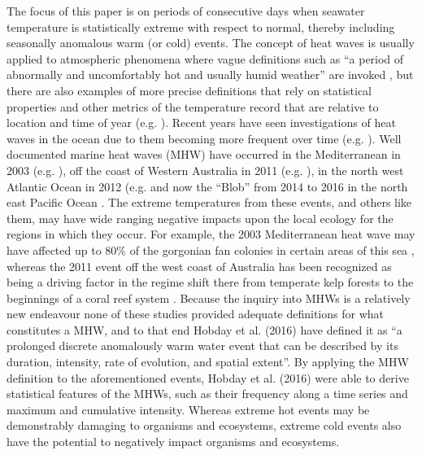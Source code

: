 \documentclass[a4paper,10pt,review]{elsarticle}
\begin{document}
The focus of this paper is on periods of consecutive days when seawater temperature is statistically extreme with respect to normal, thereby including seasonally anomalous warm (or cold) events. The concept of heat waves is usually applied to atmospheric phenomena where vague definitions such as ``a period of abnormally and uncomfortably hot and usually humid weather'' are invoked \cite{Glickman2000}, but there are also examples of more precise definitions that rely on statistical properties and other metrics of the temperature record that are relative to location and time of year (e.g. \cite{Meehl2004, Alexander2006, Fischer2010, Fischer2011}). Recent years have seen investigations of heat waves in the ocean due to them becoming more frequent over time (e.g. \cite{Mackenzie2007, Selig2010, Sura2011, Lima2012, DeCastro2014}). Well documented marine heat waves (MHW) have occurred in the Mediterranean in 2003 (e.g. \cite{Black2004, Olita2007, Garrabou2009}), off the coast of Western Australia in 2011 (e.g. \cite{Feng2013, Pearce2013, Wernberg2013}), in the north west Atlantic Ocean in 2012 (e.g. \cite{Mills2012, Chen2014, Chen2015} and now the ``Blob'' from 2014 to 2016 in the north east Pacific Ocean \cite{Bond2015}. The extreme temperatures from these events, and others like them, may have wide ranging negative impacts upon the local ecology for the regions in which they occur. For example, the 2003 Mediterranean heat wave may have affected up to 80\% of the gorgonian fan colonies in certain areas of this sea \cite{Garrabou2009}, whereas the 2011 event off the west coast of Australia has been recognized as being a driving factor in the regime shift there from temperate kelp forests to the beginnings of a coral reef system \cite{Wernberg2013}. Because the inquiry into MHWs is a relatively new endeavour none of these studies provided adequate definitions for what constitutes a MHW, and to that end Hobday et al. (2016) \cite{Hobday2016} have defined it as ``a prolonged discrete anomalously warm water event that can be described by its duration, intensity, rate of evolution, and spatial extent''. By applying the MHW definition to the aforementioned events, Hobday et al. (2016) \cite{Hobday2016} were able to derive statistical features of the MHWs, such as their frequency along a time series and maximum and cumulative intensity. Whereas extreme hot events may be demonstrably damaging to organisms and ecosystems, extreme cold events also have the potential to negatively impact organisms and ecosystems.
\end{document}
